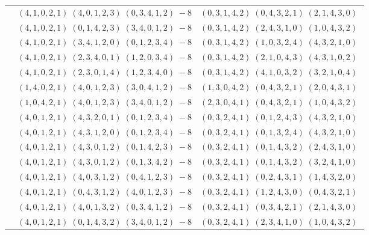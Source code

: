 \documentclass[11pt]{article}
\begin{document}
\begin{longtable}[l]{|c|c|c|}
 \cline{2-3} 
 & $(4 ,1 ,0 ,2 ,1) \;(4 ,0 ,1 ,2 ,3) \;(0 ,3 ,4 ,1 ,2) \;-8$ & $(0 ,3 ,1 ,4 ,2) \;(0 ,4 ,3 ,2 ,1) \;(2 ,1 ,4 ,3 ,0) \;$\\ 
 \cline{2-3} 
 & $(4 ,1 ,0 ,2 ,1) \;(0 ,1 ,4 ,2 ,3) \;(3 ,4 ,0 ,1 ,2) \;-8$ & $(0 ,3 ,1 ,4 ,2) \;(2 ,4 ,3 ,1 ,0) \;(1 ,0 ,4 ,3 ,2) \;$\\ 
 \cline{2-3} 
 & $(4 ,1 ,0 ,2 ,1) \;(3 ,4 ,1 ,2 ,0) \;(0 ,1 ,2 ,3 ,4) \;-8$ & $(0 ,3 ,1 ,4 ,2) \;(1 ,0 ,3 ,2 ,4) \;(4 ,3 ,2 ,1 ,0) \;$\\ 
 \cline{2-3} 
 & $(4 ,1 ,0 ,2 ,1) \;(2 ,3 ,4 ,0 ,1) \;(1 ,2 ,0 ,3 ,4) \;-8$ & $(0 ,3 ,1 ,4 ,2) \;(2 ,1 ,0 ,4 ,3) \;(4 ,3 ,1 ,0 ,2) \;$\\ 
 \cline{2-3} 
 & $(4 ,1 ,0 ,2 ,1) \;(2 ,3 ,0 ,1 ,4) \;(1 ,2 ,3 ,4 ,0) \;-8$ & $(0 ,3 ,1 ,4 ,2) \;(4 ,1 ,0 ,3 ,2) \;(3 ,2 ,1 ,0 ,4) \;$\\ 
 \cline{2-3} 
 & $(1 ,4 ,0 ,2 ,1) \;(4 ,0 ,1 ,2 ,3) \;(3 ,0 ,4 ,1 ,2) \;-8$ & $(1 ,3 ,0 ,4 ,2) \;(0 ,4 ,3 ,2 ,1) \;(2 ,0 ,4 ,3 ,1) \;$\\ 
 \cline{2-3} 
 & $(1 ,0 ,4 ,2 ,1) \;(4 ,0 ,1 ,2 ,3) \;(3 ,4 ,0 ,1 ,2) \;-8$ & $(2 ,3 ,0 ,4 ,1) \;(0 ,4 ,3 ,2 ,1) \;(1 ,0 ,4 ,3 ,2) \;$\\ 
 \cline{2-3} 
 & $(4 ,0 ,1 ,2 ,1) \;(4 ,3 ,2 ,0 ,1) \;(0 ,1 ,2 ,3 ,4) \;-8$ & $(0 ,3 ,2 ,4 ,1) \;(0 ,1 ,2 ,4 ,3) \;(4 ,3 ,2 ,1 ,0) \;$\\ 
 \cline{2-3} 
 & $(4 ,0 ,1 ,2 ,1) \;(4 ,3 ,1 ,2 ,0) \;(0 ,1 ,2 ,3 ,4) \;-8$ & $(0 ,3 ,2 ,4 ,1) \;(0 ,1 ,3 ,2 ,4) \;(4 ,3 ,2 ,1 ,0) \;$\\ 
 \cline{2-3} 
 & $(4 ,0 ,1 ,2 ,1) \;(4 ,3 ,0 ,1 ,2) \;(0 ,1 ,4 ,2 ,3) \;-8$ & $(0 ,3 ,2 ,4 ,1) \;(0 ,1 ,4 ,3 ,2) \;(2 ,4 ,3 ,1 ,0) \;$\\ 
 \cline{2-3} 
 & $(4 ,0 ,1 ,2 ,1) \;(4 ,3 ,0 ,1 ,2) \;(0 ,1 ,3 ,4 ,2) \;-8$ & $(0 ,3 ,2 ,4 ,1) \;(0 ,1 ,4 ,3 ,2) \;(3 ,2 ,4 ,1 ,0) \;$\\ 
 \cline{2-3} 
 & $(4 ,0 ,1 ,2 ,1) \;(4 ,0 ,3 ,1 ,2) \;(0 ,4 ,1 ,2 ,3) \;-8$ & $(0 ,3 ,2 ,4 ,1) \;(0 ,2 ,4 ,3 ,1) \;(1 ,4 ,3 ,2 ,0) \;$\\ 
 \cline{2-3} 
 & $(4 ,0 ,1 ,2 ,1) \;(0 ,4 ,3 ,1 ,2) \;(4 ,0 ,1 ,2 ,3) \;-8$ & $(0 ,3 ,2 ,4 ,1) \;(1 ,2 ,4 ,3 ,0) \;(0 ,4 ,3 ,2 ,1) \;$\\ 
 \cline{2-3} 
 & $(4 ,0 ,1 ,2 ,1) \;(4 ,0 ,1 ,3 ,2) \;(0 ,3 ,4 ,1 ,2) \;-8$ & $(0 ,3 ,2 ,4 ,1) \;(0 ,3 ,4 ,2 ,1) \;(2 ,1 ,4 ,3 ,0) \;$\\ 
 \cline{2-3} 
 & $(4 ,0 ,1 ,2 ,1) \;(0 ,1 ,4 ,3 ,2) \;(3 ,4 ,0 ,1 ,2) \;-8$ & $(0 ,3 ,2 ,4 ,1) \;(2 ,3 ,4 ,1 ,0) \;(1 ,0 ,4 ,3 ,2) \;$\\ 

\end{longtable}
\end{document}
